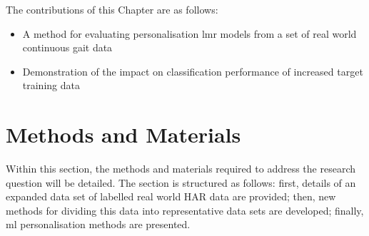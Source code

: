 The contributions of this Chapter are as follows:
\begin{itemize}
    \item A method for evaluating personalisation \acrshort{lmr} models from a set of real world continuous gait data
    \item Demonstration of the impact on classification performance of increased target training data
\end{itemize}


\section{Methods and Materials}
\label{sec:personalistaion-methods}
Within this section, the methods and materials required to address the research question will be detailed. The section is structured as follows: first, details of an expanded data set of labelled real world HAR data are provided; then, new methods for dividing this data into representative data sets are developed; finally, \acrshort{ml} personalisation methods are presented.

